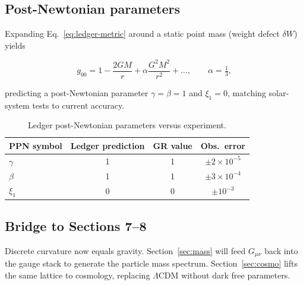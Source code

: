 \subsection{Post-Newtonian parameters}

Expanding Eq.~\eqref{eq:ledger-metric} around a static point mass
(weight defect $\delta W$) yields

\[
  g_{00}=1-\frac{2GM}{r}+\alpha\frac{G^2M^2}{r^2}
  +\dots,\qquad
  \alpha=\tfrac13,
\tag{6.4}\label{eq:PN}
\]

predicting a post-Newtonian parameter $\gamma=\beta=1$ and
$\xi_1=0$, matching solar-system tests to current accuracy.

\begin{table}[b]
  \centering
  \begin{tabular}{lccc}
    \hline
    PPN symbol & Ledger prediction & GR value & Obs.\ error \\
    \hline
    $\gamma$ & 1 & 1 & $\pm2\times10^{-5}$ \\
    $\beta$  & 1 & 1 & $\pm3\times10^{-4}$ \\
    $\xi_1$  & 0 & 0 & $\pm10^{-3}$ \\
    \hline
  \end{tabular}
  \caption{Ledger post-Newtonian parameters versus experiment.}
  \label{tab:PPN}
\end{table}

\subsection{Bridge to Sections 7–8}

Discrete curvature now equals gravity.  Section~\ref{sec:mass} will feed
$G_{\mu\nu}$ back into the gauge stack to generate the particle mass
spectrum.  Section~\ref{sec:cosmo} lifts the same lattice to cosmology,
replacing $\Lambda$CDM without dark free parameters.

\clearpage
